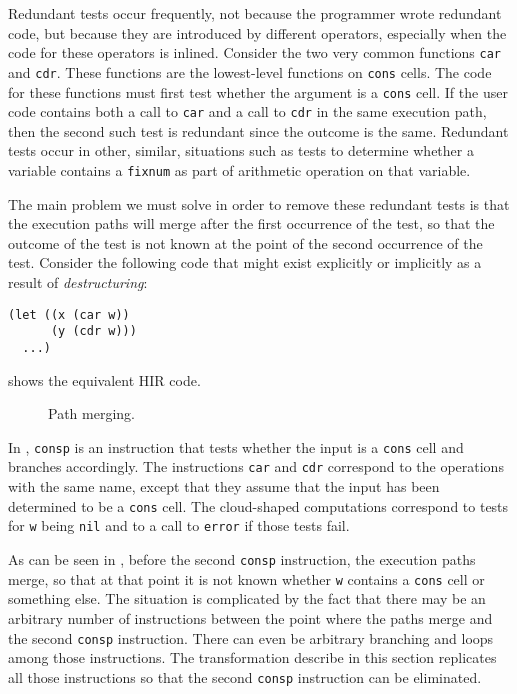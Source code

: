Redundant tests occur frequently, not because the programmer wrote
redundant code, but because they are introduced by different
\commonlisp{} operators, especially when the code for these operators
is inlined.  Consider the two very common \commonlisp{} functions
\texttt{car} and \texttt{cdr}.  These functions are the lowest-level
functions on \texttt{cons} cells.  The code for these functions must
first test whether the argument is a \texttt{cons} cell.  If the user
code contains both a call to \texttt{car} and a call to \texttt{cdr}
in the same execution path, then the second such test is redundant
since the outcome is the same.  Redundant tests occur in other,
similar, situations such as tests to determine whether a variable
contains a \texttt{fixnum} as part of arithmetic operation on that
variable.

The main problem we must solve in order to remove these redundant
tests is that the execution paths will merge after the first
occurrence of the test, so that the outcome of the test is not known
at the point of the second occurrence of the test.  Consider the
following code that might exist explicitly or implicitly as a result
of \emph{destructuring}:

\begin{verbatim}
(let ((x (car w))
      (y (cdr w)))
  ...)
\end{verbatim}

 shows the equivalent HIR code.

\begin{figure}
\begin{center}
\end{center}
\caption{\label{fig-path-merging}
Path merging.}
\end{figure}

In , \texttt{consp} is an instruction that
tests whether the input is a \texttt{cons} cell and branches
accordingly.  The instructions \texttt{car} and \texttt{cdr}
correspond to the \commonlisp{} operations with the same name, except
that they assume that the input has been determined to be a
\texttt{cons} cell.  The cloud-shaped computations correspond to tests
for \texttt{w} being \texttt{nil} and to a call to \texttt{error} if
those tests fail.

As can be seen in , before the second
\texttt{consp} instruction, the execution paths merge, so that at that
point it is not known whether \texttt{w} contains a \texttt{cons} cell
or something else.  The situation is complicated by the fact that
there may be an arbitrary number of instructions between the point
where the paths merge and the second \texttt{consp} instruction.
There can even be arbitrary branching and loops among those
instructions.  The transformation describe in this section replicates
all those instructions so that the second \texttt{consp} instruction
can be eliminated.

